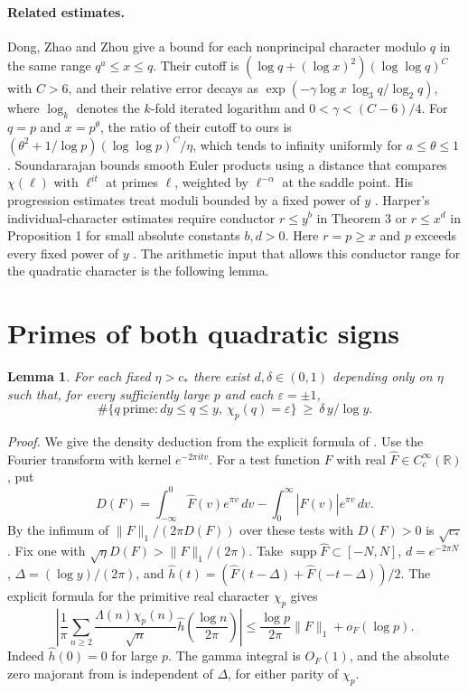 \documentclass[11pt]{article}
\newcommand{\ch}{\chi_p}
\newcommand{\cstar}{c_*}
\newcommand{\ep}{\varepsilon}
\newtheorem{lemma}{Lemma}
\begin{document}
\paragraph{Related estimates.}
Dong, Zhao and Zhou give a bound for each nonprincipal character modulo
\(q\) in the same range \(q^a\le x\le q\). Their cutoff is
\((\log q+(\log x)^2)(\log\log q)^C\) with \(C>6\), and their relative
error decays as \(\exp(-\gamma\log x\,\log_3 q/\log_2 q)\), where
\(\log_k\) denotes the \(k\)-fold iterated logarithm and
\(0<\gamma<(C-6)/4\). For \(q=p\) and \(x=p^\theta\), the ratio of
their cutoff to ours is
\((\theta^2+1/\log p)(\log\log p)^C/\eta\), which tends to infinity
uniformly for \(a\le\theta\le1\) \cite[Theorem 1.4]{dzz}.
Soundararajan bounds smooth Euler products using a distance that
compares \(\chi(\ell)\) with \(\ell^{it}\) at primes \(\ell\), weighted
by \(\ell^{-\alpha}\) at the saddle point. His progression estimates treat
moduli bounded by a fixed power of \(y\) \cite[\S4, following (4.1)]{sound}.
Harper's individual-character estimates require conductor \(r\le y^b\)
in Theorem 3 or \(r\le x^d\) in Proposition 1 for small absolute
constants \(b,d>0\). Here \(r=p\ge x\) and \(p\) exceeds every fixed
power of \(y\) \cite{harper}. The arithmetic input that allows this
conductor range for the quadratic character is the following lemma.

\section{Primes of both quadratic signs}
\begin{lemma}\label{lem:signs}
For each fixed \(\eta>\cstar\) there exist \(d,\delta\in(0,1)\)
depending only on \(\eta\) such that, for every sufficiently large \(p\)
and each \(\ep=\pm1\),
\begin{equation}\label{eq:both}
 \#\{q\ \mathrm{prime}:dy\le q\le y,\ \ch(q)=\ep\}
 \ \ge\ \delta\, y/\log y .
\end{equation}
\end{lemma}
\emph{Proof.}
We give the density deduction from the explicit formula of \cite{cmqr}.
Use the Fourier transform with kernel \(e^{-2\pi itv}\). For a test
function \(F\) with real \(\widehat F\in C_c^\infty(\mathbb R)\), put
\[
 D(F)=\int_{-\infty}^{0}\widehat F(v)e^{\pi v}\,dv
        -\int_0^\infty|\widehat F(v)|e^{\pi v}\,dv .
\]
By \cite[Theorem 4(i) and (4.13)]{cmqr} the infimum of
\(\|F\|_1/(2\pi D(F))\) over these tests with \(D(F)>0\) is
\(\sqrt{\cstar}\). Fix one with \(\sqrt\eta D(F)>\|F\|_1/(2\pi)\).
Take \(\operatorname{supp}\widehat F\subset[-N,N]\),
\(d=e^{-2\pi N}\), \(\Delta=(\log y)/(2\pi)\), and
\(\widehat h(t)=(\widehat F(t-\Delta)+\widehat F(-t-\Delta))/2\).
The explicit formula for the primitive real character \(\ch\) gives
\begin{equation}\label{eq:ef}
 \left|\frac1\pi\sum_{n\ge2}
  \frac{\Lambda(n)\ch(n)}{\sqrt n}\widehat h\!\left(\frac{\log n}{2\pi}\right)
 \right|
 \le \frac{\log p}{2\pi}\|F\|_1+o_F(\log p).
\end{equation}
Indeed \(\widehat h(0)=0\) for large \(p\). The gamma integral is
\(O_F(1)\), and the absolute zero majorant from
\cite[(4.2), (4.9)--(4.11)]{cmqr} is independent of \(\Delta\), for
either parity of \(\ch\).
\end{document}
